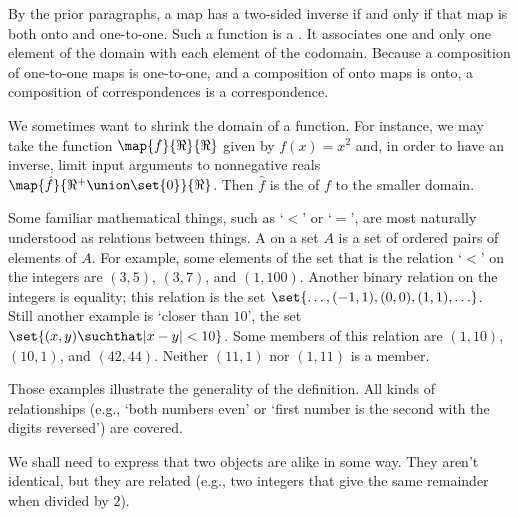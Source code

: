 By the prior paragraphs, a map has a two-sided inverse 
if and only if that map is both onto and one-to-one. 
Such a function is a 
.
It associates one and only one element of the domain with each element of the
codomain.
Because a composition of one-to-one maps is one-to-one, and a composition
of onto maps is onto, a composition of correspondences is a
correspondence.

We sometimes want to shrink the domain of a function.
For instance, we may take the function \( \map{f}{\Re}{\Re} \) given by
\( f(x)=x^2 \) and, in order to have an inverse, limit input arguments to
nonnegative reals \( \map{\hat{f}}{\Re^+\union\set{0}}{\Re} \).
Then \( \hat{f} \) is 
the  of
\( f \) to the smaller domain.








Some familiar mathematical things, such as `\( < \)' or `\( = \)',
are most naturally understood as relations between things.
A  on a set \( A \) is
a set of ordered pairs of elements of \( A \).
For example, some elements of the set that is the
relation `$<$' on the integers are
\( (3,5) \), \( (3,7) \), and \( (1,100) \).
Another binary relation on the integers is equality; this relation is
the set
\( \set{\ldots, (-1,1), (0,0),(1,1),\ldots} \).
Still another example is `closer than \( 10 \)', the set
\( \set{(x,y)\suchthat |x-y|<10 } \).
Some members of this relation are \( (1,10) \), \( (10,1) \),
and \( (42,44) \).
Neither \( (11,1) \) nor \( (1,11) \) is a member.

Those examples illustrate the generality of the definition.
All kinds of relationships (e.g., `both numbers
even' or `first number is the second with the digits reversed')
are covered.




We shall need to express that two objects are alike in some way.
They aren't identical, but they are related
(e.g., two integers that give the same remainder when divided by \( 2 \)).

